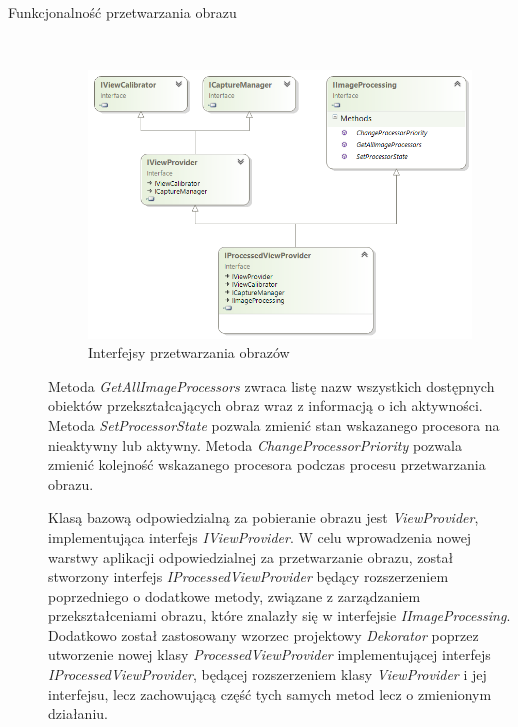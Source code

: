 \documentclass[a4paper,11pt,twoside]{report}
\theoremstyle{definition}
\begin{document}
\begin{description}

\item [Funkcjonalność przetwarzania obrazu] \hfill \\
\begin{figure}[h]
\centering
\includegraphics[scale=0.9]{images/IProcessedViewProvider}
\caption[Przetwarzanie diagram]{Interfejsy przetwarzania obrazów}
\end{figure}

Metoda \textit{GetAllImageProcessors} zwraca listę nazw wszystkich dostępnych obiektów przekształcających obraz wraz z informacją o ich aktywności.
Metoda \textit{SetProcessorState} pozwala zmienić stan wskazanego procesora na nieaktywny lub aktywny.
Metoda \textit{ChangeProcessorPriority} pozwala zmienić kolejność wskazanego procesora podczas procesu przetwarzania obrazu. 

Klasą bazową odpowiedzialną za pobieranie obrazu jest \textit{ViewProvider}, implementująca interfejs \textit{IViewProvider}. W celu wprowadzenia nowej warstwy aplikacji odpowiedzialnej za przetwarzanie obrazu, został stworzony interfejs \textit{IProcessedViewProvider} będący rozszerzeniem poprzedniego o dodatkowe metody, związane z zarządzaniem przekształceniami obrazu, które znalazły się w interfejsie \textit{IImageProcessing}. Dodatkowo został zastosowany wzorzec projektowy \textit{Dekorator} poprzez utworzenie nowej klasy \textit{ProcessedViewProvider} implementującej interfejs \textit{IProcessedViewProvider}, będącej rozszerzeniem klasy \textit{ViewProvider} i jej interfejsu, lecz zachowującą część tych samych metod lecz o zmienionym działaniu.


\end{description}
\end{document}
